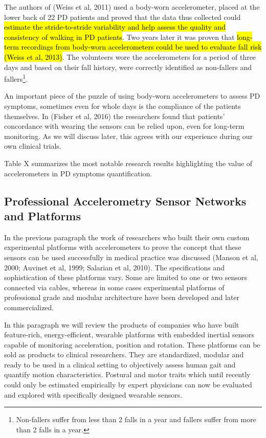 The authors of (Weiss et al, 2011) used a body-worn accelerometer, placed at the lower back of 22 \gls{PD} patients and proved that the data thus collected could \hl{estimate the stride-to-stride variability and help assess the quality and consistency of walking in PD patients}. Two years later it was proven that \hl{long-term recordings from body-worn accelerometers could be used to evaluate fall risk (Weiss et al, 2013)}. The volunteers wore the accelerometers for a period of three days and based on their fall history, were correctly identified as non-fallers and fallers\footnote{Non-fallers suffer from less than 2 falls in a year and fallers suffer from more than 2 falls in a year.}. 

An important piece of the puzzle of using body-worn accelerometers to assess \gls{PD} symptoms, sometimes even for whole days is the compliance of the patients themselves. In (Fisher et al, 2016) the researchers found that patients' concordance with wearing the sensors can be relied upon, even for long-term monitoring. As we will discuss later, this agrees with our experience during our own clinical trials.

\textcolor{BurntOrange}{Table X} summarizes the most notable research results highlighting the value of accelerometers in \gls{PD} symptoms quantification. 



\subsection{Professional Accelerometry Sensor Networks and Platforms}
\label{subsec:sensorNetworks}
In the previous paragraph the work of researchers who built their own custom experimental platforms with accelerometers to prove the concept that these sensors can be used successfully in medical practice was discussed (Manson et al, 2000; Auvinet et al, 1999; Salarian et al, 2010). The specifications and sophistication of these platforms vary. Some are limited to one or two sensors connected via cables, whereas in some cases experimental platforms of professional grade and modular architecture have been developed and later commercialized.

In this paragraph we will review the products of companies who have built feature-rich, energy-efficient, wearable platforms with embedded inertial sensors capable of monitoring acceleration, position and rotation. These platforms can be sold as products to clinical researchers. They are standardized, modular and ready to be used in a clinical setting to objectively assess human gait and quantify motion characteristics. Postural and motor traits which until recently could only be estimated empirically by expert physicians can now be evaluated and explored with specifically designed wearable sensors. 

